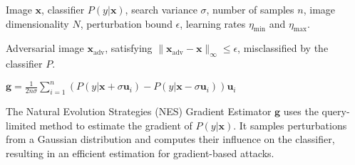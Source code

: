 Image $\mathbf{x}$, classifier $P(y|\mathbf{x})$, search variance $\sigma$, number of samples $n$, image dimensionality $N$, perturbation bound $\epsilon$, learning rates $\eta_{\text{min}}$ and $\eta_{\text{max}}$.

Adversarial image $\mathbf{x}_{\text{adv}}$, satisfying $\|\mathbf{x}_{\text{adv}} - \mathbf{x}\|_\infty \leq \epsilon$, misclassified by the classifier $P$.


$\mathbf{g} = \frac{1}{2n\sigma} \sum_{i=1}^{n} \left( P(y|\mathbf{x} + \sigma \mathbf{u}_i) - P(y|\mathbf{x} - \sigma \mathbf{u}_i) \right) \mathbf{u}_i$

The Natural Evolution Strategies (NES) Gradient Estimator $\mathbf{g}$ uses the query-limited method to estimate the gradient of $P(y|\mathbf{x})$. It samples perturbations from a Gaussian distribution and computes their influence on the classifier, resulting in an efficient estimation for gradient-based attacks.
